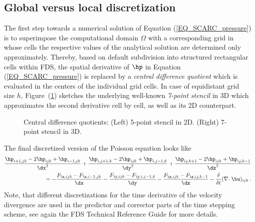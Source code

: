 \subsection{Global versus local discretization}
\label{SEC_SCARC_discretization_poisson}

The first step towards a numerical solution of Equation (\ref{EQ_SCARC_pressure}) is to superimpose the computational domain $\Omega$ with a corresponding grid in whose cells the respective values of the analytical solution are determined only approximately. 
Thereby, based on default subdivision into structured rectangular cells within FDS,
the spatial derivative of $\hp$ in Equation (\ref{EQ_SCARC_pressure}) is replaced by a 
{\it central difference quotient} which is evaluated in the centers of the individual grid cells.  In case of equidistant grid size $h$, %
Figure~(\ref{FIG_SCARC_five_point_stencil}) sketches the underlying well-known {\it 7-point stencil} in 3D which approximates the second derivative cell by cell, as well as its 2D counterpart.
\begin{figure}[htb]
\begin{center}
%
\begin{minipage}[htb]{0.6\textwidth}

\end{minipage}
\hspace{-1.5cm}
\begin{minipage}[htb]{0.25\textwidth}

\vspace{-0.6cm}
\end{minipage}
%
\caption{Central difference quotients: (Left) 5-point stencil in 2D. (Right) 7-point stencil in 3D.}
\label{FIG_SCARC_five_point_stencil}
\end{center}
\end{figure}

The final discretized version of the Poisson equation looks like
\small
\begin{align}
\frac{\hp_{i+1,jk}-2\hp_{ijk}+\hp_{i-1,jk}}{\dx^2} +
\frac{\hp_{i,j+1,k}-2\hp_{ijk}+\hp_{i,j-1,k}}{\dy^2} +
\frac{\hp_{ij,k+1}-2\hp_{ijk}+\hp_{ij,k-1}}{\dz^2} \notag \\ =
    -\frac{F_{\x,ijk} - F_{\x,i-1,jk}}{\dx}
    -\frac{F_{\y,ijk} - F_{\y,i,j-1,k}}{\dy}
    -\frac{F_{\z,ijk} - F_{\z,ij,k-1}}{\dz} - \frac{\delta}{\delta t}(\nabla\!\cdot \bu)_{ijk}\,.
\label{EQ_SCARC_discrete_poisson}
\end{align}
\normalsize
Note, that different discretizations for the time derivative of the velocity divergence are used in the predictor and corrector parts of the time stepping scheme, see again the FDS Technical Reference Guide\cite{McGrattan:2018:TG} for more details. 

